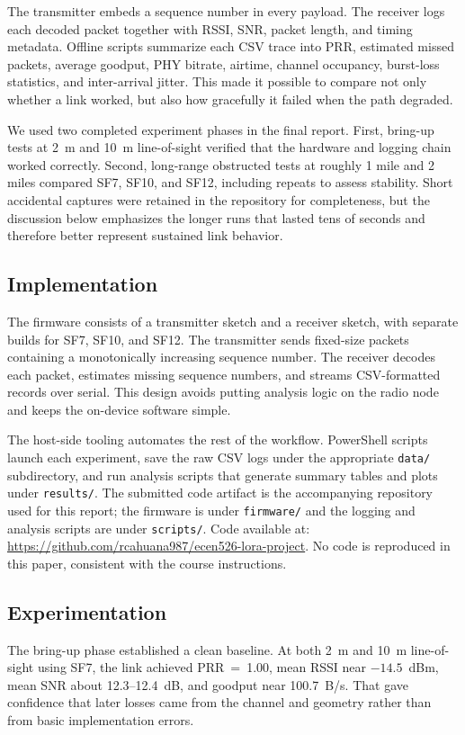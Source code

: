 \documentclass[letterpaper,twocolumn,10pt]{article}
\begin{document}
The transmitter embeds a sequence number in every payload. The receiver logs each decoded packet together with RSSI, SNR, packet length, and timing metadata. Offline scripts summarize each CSV trace into PRR, estimated missed packets, average goodput, PHY bitrate, airtime, channel occupancy, burst-loss statistics, and inter-arrival jitter. This made it possible to compare not only whether a link worked, but also how gracefully it failed when the path degraded.

We used two completed experiment phases in the final report. First, bring-up tests at 2~m and 10~m line-of-sight verified that the hardware and logging chain worked correctly. Second, long-range obstructed tests at roughly 1 mile and 2 miles compared SF7, SF10, and SF12, including repeats to assess stability. Short accidental captures were retained in the repository for completeness, but the discussion below emphasizes the longer runs that lasted tens of seconds and therefore better represent sustained link behavior.

\subsection*{Implementation}
The firmware consists of a transmitter sketch and a receiver sketch, with separate builds for SF7, SF10, and SF12. The transmitter sends fixed-size packets containing a monotonically increasing sequence number. The receiver decodes each packet, estimates missing sequence numbers, and streams CSV-formatted records over serial. This design avoids putting analysis logic on the radio node and keeps the on-device software simple.

The host-side tooling automates the rest of the workflow. PowerShell scripts launch each experiment, save the raw CSV logs under the appropriate \texttt{data/} subdirectory, and run analysis scripts that generate summary tables and plots under \texttt{results/}. The submitted code artifact is the accompanying repository used for this report; the firmware is under \texttt{firmware/} and the logging and analysis scripts are under \texttt{scripts/}. Code available at: \url{https://github.com/rcahuana987/ecen526-lora-project}. No code is reproduced in this paper, consistent with the course instructions.

\subsection*{Experimentation}
The bring-up phase established a clean baseline. At both 2~m and 10~m line-of-sight using SF7, the link achieved PRR~=~1.00, mean RSSI near $-14.5$~dBm, mean SNR about 12.3--12.4~dB, and goodput near 100.7~B/s. That gave confidence that later losses came from the channel and geometry rather than from basic implementation errors.
\end{document}
